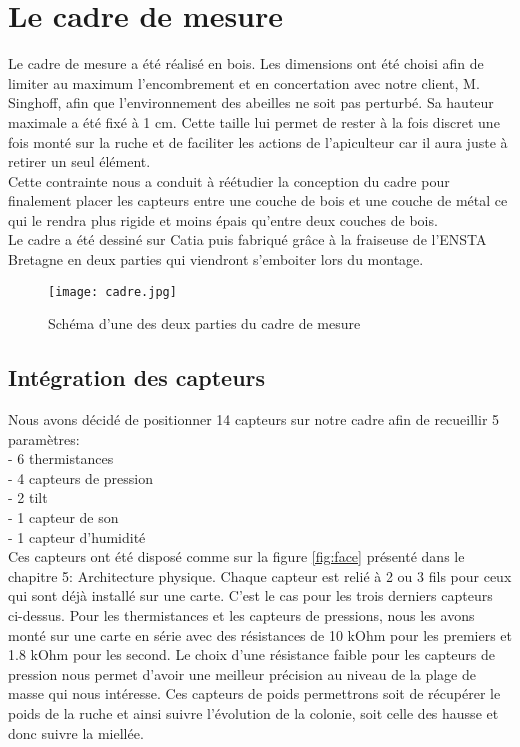 \chapter{Le cadre de mesure}

Le cadre de mesure a été réalisé en bois. Les dimensions ont été choisi afin de limiter au maximum l'encombrement et en concertation avec notre client, M. Singhoff, afin que l'environnement des abeilles ne soit pas perturbé. Sa hauteur maximale a été fixé à 1 cm. Cette taille lui permet de rester à la fois discret une fois monté sur la ruche et de faciliter les actions de l'apiculteur car il aura juste à retirer un seul élément.\\
Cette contrainte nous a conduit à réétudier la conception du cadre pour finalement placer les capteurs entre une couche de bois et une couche de métal ce qui le rendra plus rigide et moins épais qu'entre deux couches de bois.\\
Le cadre a été dessiné sur Catia puis fabriqué grâce à la fraiseuse de l'ENSTA Bretagne en deux parties qui viendront s'emboiter lors du montage.\\

\begin{figure}[h!]
\centering\texttt{[image: cadre.jpg]}
\caption{\label{fig:cote1} Schéma d'une des deux parties du cadre de mesure}
\end{figure}

\clearpage

\section{Intégration des capteurs}

Nous avons décidé de positionner 14 capteurs sur notre cadre afin de recueillir 5 paramètres:\\

\indent - 6 thermistances \\
\indent - 4 capteurs de pression \\ 
\indent - 2 tilt \\ 
\indent - 1 capteur de son \\
\indent - 1 capteur d'humidité \\

Ces capteurs ont été disposé comme sur la figure \ref{fig:face} présenté dans le chapitre 5: Architecture physique. Chaque capteur est relié à 2 ou 3 fils pour ceux qui sont déjà installé sur une carte. C'est le cas pour les trois derniers capteurs ci-dessus. Pour les thermistances et les capteurs de pressions, nous les avons monté sur une carte en série avec des résistances de 10 kOhm pour les premiers et 1.8 kOhm pour les second. Le choix d'une résistance faible pour les capteurs de pression nous permet d'avoir une meilleur précision au niveau de la plage de masse qui nous intéresse. Ces capteurs de poids permettrons soit de récupérer le poids de la ruche et ainsi suivre l'évolution de la colonie, soit celle des hausse et donc suivre la miellée.\\

